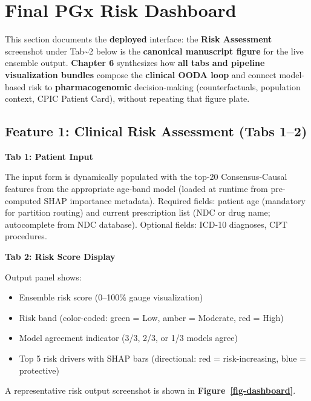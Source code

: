 \documentclass[
  12pt,
]{book}
\providecommand{\tightlist}{%
  \setlength{\itemsep}{0pt}\setlength{\parskip}{0pt}}
\begin{document}
\chapter{Final PGx Risk Dashboard}\label{sec-features}

This section documents the \textbf{deployed} interface: the \textbf{Risk
Assessment} screenshot under Tab\textasciitilde2 below is the
\textbf{canonical manuscript figure} for the live ensemble output.
\textbf{Chapter 6} synthesizes how \textbf{all tabs and pipeline
visualization bundles} compose the \textbf{clinical OODA loop} and
connect model-based risk to \textbf{pharmacogenomic} decision-making
(counterfactuals, population context, CPIC Patient Card), without
repeating that figure plate.

\section{Feature 1: Clinical Risk Assessment (Tabs
1--2)}\label{feature-1-clinical-risk-assessment-tabs-12}

\textbf{Tab 1: Patient Input}

The input form is dynamically populated with the top-20 Consensus-Causal
features from the appropriate age-band model (loaded at runtime from
pre-computed SHAP importance metadata). Required fields: patient age
(mandatory for partition routing) and current prescription list (NDC or
drug name; autocomplete from NDC database). Optional fields: ICD-10
diagnoses, CPT procedures.

\textbf{Tab 2: Risk Score Display}

Output panel shows:

\begin{itemize}
\tightlist
\item
  Ensemble risk score (0--100\% gauge visualization)
\item
  Risk band (color-coded: green = Low, amber = Moderate, red = High)
\item
  Model agreement indicator (3/3, 2/3, or 1/3 models agree)
\item
  Top 5 risk drivers with SHAP bars (directional: red = risk-increasing,
  blue = protective)
\end{itemize}

A representative risk output screenshot is shown in
\textbf{Figure~\ref{fig-dashboard}}.
\end{document}
